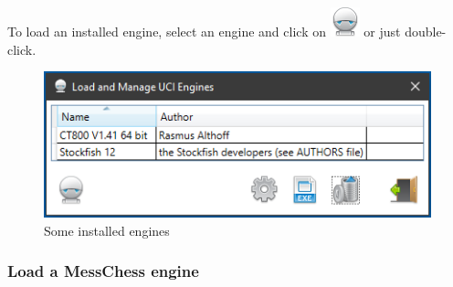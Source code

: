 \documentclass[11pt,a4paper]{article}
\begin{document}
To load an installed engine, select an engine and click on \includegraphics[scale=0.5]{robot.png} or just double-click.

\begin{figure}[H]
	\centering
	\includegraphics[scale=1.0]{LoadEngine2.png}
	\caption{Some installed engines}
	\label{fig:LoadEngine2}
\end{figure}


\subsubsection{Load a MessChess engine}
\end{document}
